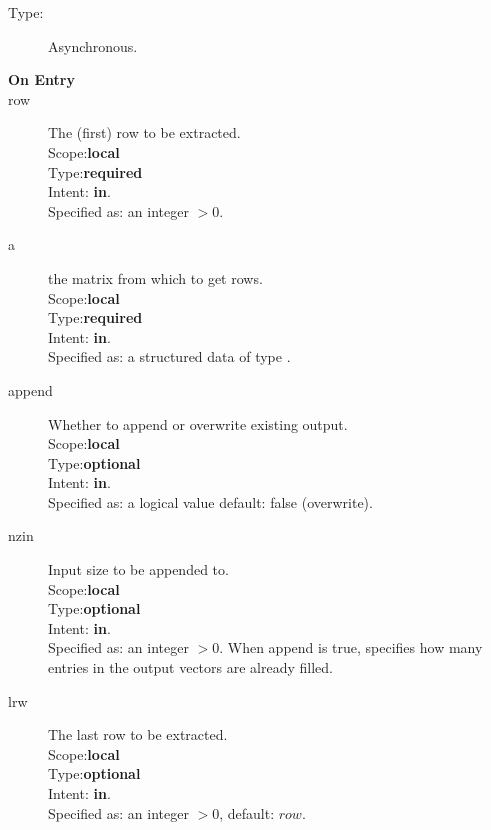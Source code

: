 

\begin{description}
\item[Type:] Asynchronous.
\item[\bf On Entry]
\item[row] The (first) row to be extracted.\\
Scope:{\bf local}\\
Type:{\bf required}\\
Intent: {\bf in}.\\
Specified as: an integer $>0$.
\item[a] the matrix from  which to get rows.\\
Scope:{\bf local}\\
Type:{\bf required}\\
Intent: {\bf in}.\\
Specified as: a structured data of type \spdata.
\item[append] Whether to append or overwrite existing output.\\
Scope:{\bf local}\\
Type:{\bf optional}\\
Intent: {\bf in}.\\
Specified as: a logical value default: false (overwrite).
\item[nzin] Input size to be appended to.\\
Scope:{\bf local}\\
Type:{\bf optional}\\
Intent: {\bf in}.\\
Specified as: an integer $>0$. When append is true, specifies how many
entries in the output vectors are already filled. 
\item[lrw] The last  row to be extracted.\\
Scope:{\bf local}\\
Type:{\bf optional}\\
Intent: {\bf in}.\\
Specified as: an integer $>0$, default: $row$.

\end{description}

